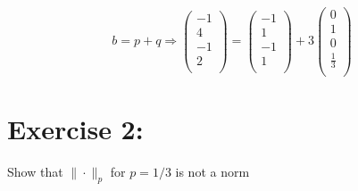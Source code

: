 \documentclass{article}
\begin{document}
\begin{enumerate}
    \begin{equation*}
        b = p + q \Longrightarrow
        \left(
            \begin{array}{r}
                -1\\
                4\\
                -1\\
                2\\
            \end{array}
        \right) = 
        \left(
            \begin{array}{r}
                -1\\
                1\\
                -1\\
                1\\
            \end{array}
        \right) + 3
        \left(
            \begin{array}{r}
                0\\
                1\\
                0\\
                \frac{1}{3}\\
            \end{array}
        \right)
    \end{equation*}
    
\end{enumerate}

\section*{Exercise 2:}

Show that $\| \cdot \|_p$ for $p=1/3$ is not a norm 

\end{document}
